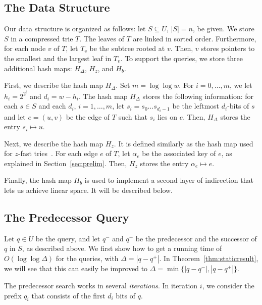 \documentclass[a4paper,11pt]{article}
\newcommand{\?}{\mskip1.5mu}
\begin{document}
\subsection{The Data Structure}
Our data structure is organized as follows:
let $S \subseteq U$, $|S| = n$, be given.
We store $S$ in a compressed trie
$T$. The leaves of $T$ are
linked in sorted order. Furthermore, 
for each node $v$ of $T$, let $T_v$ be the
subtree rooted at $v$. Then, $v$ stores pointers 
to the smallest and the largest leaf in 
$T_v$. To support the queries, we store 
three additional hash maps: $H_\Delta$, $H_z$,
and $H_b$.

First, we describe the hash map $H_\Delta$.
Set $m = \log\log w$. For
$i = 0, \dots, m$, we let
$h_i = 2^{2^i}$ and  
$d_i = w - h_i$. 
The hash map $H_\Delta$ stores the following
information: for each $s \in S$ and each
$d_i$, $i = 1, \dots, m$,
let $s_i = s_0 \dots s_{d_i-1}$ be the leftmost
$d_i$-bits of $s$ and let $e = (u,v)$ be
the edge of $T$ such that $s_i$ lies
on $e$.
Then, $H_\Delta$ stores the entry
$s_i \mapsto u$.

Next, we describe the hash map $H_z$.
It is defined similarly as the hash map
used for $z$-fast tries~\cite{BelazzouguiBoVi10,Ruzic09}.
For each edge $e$ of $T$, let $\alpha_e$ be
the associated key of $e$, as explained in 
Section~\ref{sec:prelim}.
Then, $H_z$ stores the entry $\alpha_e \mapsto e$.


Finally, the hash map $H_b$ is used to implement
a second layer of indirection that lets us achieve
linear space. It will be described below.

\subsection{The Predecessor Query}
\label{sec:staticquery}

Let $q \in U$ be the query, and let
$q^-$ and $q^+$ be the predecessor and
the successor of $q$ in $S$, as described above.
We first show how to get a running time
of $O(\log\log \Delta)$ for the queries, with  
$\Delta = |q - q^+|$.  In Theorem~\ref{thm:staticresult}, we will 
see that this can easily be improved
to $\Delta = \min\{|q - q^-|, |q - q^+|\}$.

The predecessor search works in several 
\emph{iterations}. In iteration $i$, we consider
the prefix $q_i$ that consists of the first $d_i$ 
bits of $q$.
\end{document}
